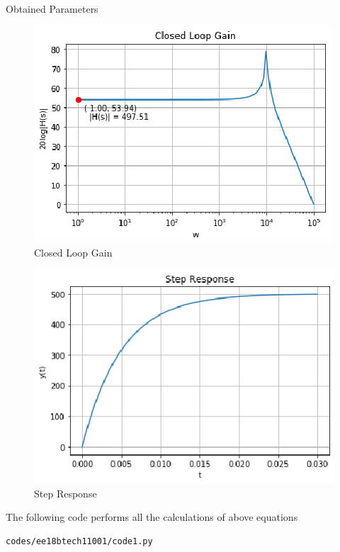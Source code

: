 \begin{enumerate}[label=\thesection.\arabic*.,ref=\thesection.\theenumi]
\begin{table}[!ht]
\centering

\caption{Obtained Parameters}
\label{table:ee18btech11001_params}
\end{table}


\begin{figure}[!ht]
\centering
    \includegraphics[width=\columnwidth]{./figs/ee18btech11001/Figure_2.eps}
  \caption{Closed Loop Gain}
  \label{fig:ee18btech11001_fig2}
\end{figure}

\begin{figure}[!ht]
\centering
    \includegraphics[width=\columnwidth]{./figs/ee18btech11001/Figure_3.eps}
  \caption{Step Response}
  \label{fig:ee18btech11001_fig3}
\end{figure}
The following code performs all the calculations of above equations
\begin{lstlisting}
codes/ee18btech11001/code1.py
\end{lstlisting}


\end{enumerate}
